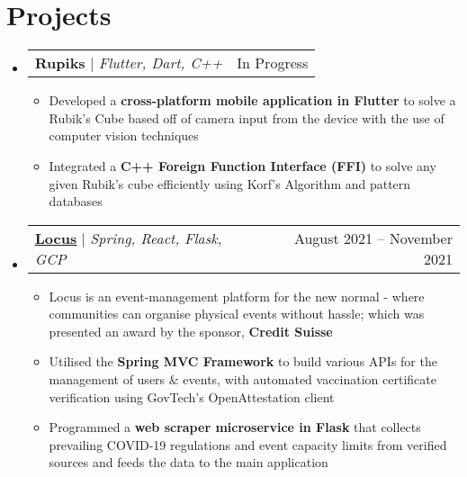 \documentclass[letterpaper,11pt]{article}
\makeatletter
\newcommand{\resumeItem}[1]{
  \item\small{
    {#1 \vspace{-2pt}}
  }
}
\newcommand{\resumeProjectHeading}[2]{
    \item
    \begin{tabular*}{0.97\textwidth}{l@{\extracolsep{\fill}}r}
      \small#1 & #2 \\
    \end{tabular*}\vspace{-7pt}
}
\newcommand{\resumeSubHeadingListStart}{\begin{itemize}[leftmargin=0.15in, label={}]}
\newcommand{\resumeSubHeadingListEnd}{\end{itemize}}
\newcommand{\resumeItemListStart}{\begin{itemize}}
\newcommand{\resumeItemListEnd}{\end{itemize}\vspace{-5pt}}
\makeatother
\begin{document}
\section{Projects}
    \resumeSubHeadingListStart
      \resumeProjectHeading
          {\textbf{Rupiks} $|$ \emph{Flutter, Dart, C++}}{In Progress}
          \resumeItemListStart
            \resumeItem{Developed a \textbf{cross-platform mobile application in Flutter} to solve a Rubik's Cube based off of camera input from the device with the use of computer vision techniques}
            \resumeItem{Integrated a \textbf{C++ Foreign Function Interface (FFI)} to solve any given Rubik's cube efficiently using Korf's Algorithm and pattern databases}
          \resumeItemListEnd
      \resumeProjectHeading
          {\textbf{\href{https://github.com/omerwyo/Locus}{\underline{Locus}}} $|$ \emph{Spring, React, Flask, GCP}}{August 2021 -- November 2021}
          \resumeItemListStart
            \resumeItem{Locus is an event-management platform for the new normal - where communities can organise physical events without hassle; which was presented an award by the sponsor, \textbf{Credit Suisse}}
            \resumeItem{Utilised the \textbf{Spring MVC Framework} to build various APIs for the management of users \& events, with automated vaccination certificate verification using GovTech's OpenAttestation client}
            \resumeItem{Programmed a \textbf{web scraper microservice in Flask} that collects prevailing COVID-19 regulations and event capacity limits from verified sources and feeds the data to the main application}
          \resumeItemListEnd
    \resumeSubHeadingListEnd
%
\end{document}
